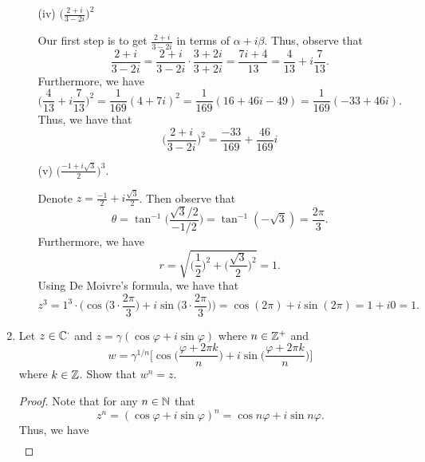 \documentclass[a4paper]{article}
\begin{document}
\begin{enumerate}
\begin{enumerate}
            \item[(iv)] \( \Big(  \frac{ 2 + i  }{ 3 -2i }  \Big)^{2} \)
                \begin{solution}
                Our first step is to get \( \frac{ 2 + i  }{  3 -2i }  \) in terms of \( \alpha + i \beta  \). Thus, observe that
                \[  \frac{ 2 + i  }{ 3 - 2i } = \frac{ 2 + i  }{ 3 - 2i } \cdot \frac{ 3 + 2i }{ 3 + 2i } = \frac{ 7i + 4  }{ 13 } = \frac{ 4 }{ 13 }  + i \frac{ 7 }{ 13 }.    \]
               Furthermore, we have 
               \[  \Big(  \frac{ 4 }{ 13 } + i \frac{ 7 }{ 13 }  \Big)^{2} = \frac{ 1 }{ 169 } ( 4 + 7i)^{2} = \frac{ 1 }{ 169  } (16 + 46i - 49) = \frac{ 1 }{ 169  }(-33 + 46i).    \]
               Thus, we have that 
               \[  \Big(  \frac{ 2 + i  }{ 3 -2i }  \Big)^{2} = \frac{ -33 }{ 169  } + \frac{ 46 }{ 169 }i  \]
                \end{solution}
            \item[(v)] \( \Big(  \frac{ - 1 + i \sqrt{ 3 }  }{ 2 }  \Big)^{3} \).
                \begin{solution}
                   Denote \( z = \frac{ -1 }{ 2 }  + i \frac{ \sqrt{ 3 }  }{ 2 }  \). Then observe that  
                   \[  \theta = \tan^{-1} \Big(  \frac{ \sqrt{ 3 } / 2 }{ -1 / 2 }  \Big) = \tan^{-1}(- \sqrt{ 3 } ) = \frac{ 2 \pi  }{ 3 }.   \]
                   Furthermore, we have
                   \[  r = \sqrt{ \Big(  \frac{ 1 }{ 2 }  \Big)^{2} + \Big(  \frac{ \sqrt{ 3 }  }{ 2 }  \Big)^{2} } = 1.   \]
                   Using De Moivre's formula, we have that 
                   \[  z^{3} = 1^{3} \cdot \Big(  \cos \Big( 3 \cdot \frac{ 2 \pi  }{ 3 }    \Big) + i \sin \Big(  3 \cdot \frac{ 2 \pi  }{ 3 }  \Big) \Big) = \cos(2 \pi) + i \sin(2 \pi ) = 1 + i0 = 1.  \]
                \end{solution}
        \end{enumerate}
    \item Let \( z \in \mathbb{C}^{\cdot} \) and \( z = \gamma ( \cos \varphi + i \sin \varphi)\) where \( n \in \mathbb{Z}^{+}  \) and  
        \[  w = \gamma^{1/n} \Bigg[ \cos \Big(  \frac{ \varphi + 2 \pi k  }{ n  } \Big)  + i \sin \Big(  \frac{ \varphi + 2 \pi k  }{ n  }  \Big)\Bigg]  \]
        where \( k \in \mathbb{Z}  \). Show that \( w^{n} = z  \).
        \begin{proof}
        Note that for any \( n \in \mathbb{N}  \) that 
        \[ z^{n} = ( \cos \varphi + i \sin \varphi )^{n} = \cos n \varphi + i \sin n \varphi.    \]
        Thus, we have
        \begin{align*}

\end{align*}
\end{proof}
\end{enumerate}
\end{document}
